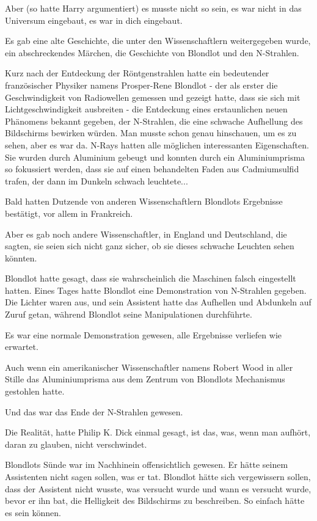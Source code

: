 Aber (so hatte Harry argumentiert) es musste nicht so sein, es war nicht in das
Universum eingebaut, es war in dich eingebaut.

Es gab eine alte Geschichte, die unter den Wissenschaftlern weitergegeben wurde,
ein abschreckendes Märchen, die Geschichte von Blondlot und den N-Strahlen.

Kurz nach der Entdeckung der Röntgenstrahlen hatte ein bedeutender französischer
Physiker namens Prosper-Rene Blondlot - der als erster die Geschwindigkeit von
Radiowellen gemessen und gezeigt hatte, dass sie sich mit Lichtgeschwindigkeit
ausbreiten - die Entdeckung eines erstaunlichen neuen Phänomens bekannt gegeben,
der N-Strahlen, die eine schwache Aufhellung des Bildschirms bewirken würden.
Man musste schon genau hinschauen, um es zu sehen, aber es war da. N-Rays hatten
alle möglichen interessanten Eigenschaften. Sie wurden durch Aluminium gebeugt
und konnten durch ein Aluminiumprisma so fokussiert werden, dass sie auf einen
behandelten Faden aus Cadmiumsulfid trafen, der dann im Dunkeln schwach
leuchtete...

Bald hatten Dutzende von anderen Wissenschaftlern Blondlots Ergebnisse
bestätigt, vor allem in Frankreich.

Aber es gab noch andere Wissenschaftler, in England und Deutschland, die sagten,
sie seien sich nicht ganz sicher, ob sie dieses schwache Leuchten sehen könnten.

Blondlot hatte gesagt, dass sie wahrscheinlich die Maschinen falsch eingestellt
hatten. Eines Tages hatte Blondlot eine Demonstration von N-Strahlen gegeben.
Die Lichter waren aus, und sein Assistent hatte das Aufhellen und Abdunkeln auf
Zuruf getan, während Blondlot seine Manipulationen durchführte.

Es war eine normale Demonstration gewesen, alle Ergebnisse verliefen wie
erwartet.

Auch wenn ein amerikanischer Wissenschaftler namens Robert Wood in aller Stille
das Aluminiumprisma aus dem Zentrum von Blondlots Mechanismus gestohlen hatte.

Und das war das Ende der N-Strahlen gewesen.

Die Realität, hatte Philip K. Dick einmal gesagt, ist das, was, wenn man
aufhört, daran zu glauben, nicht verschwindet.

Blondlots Sünde war im Nachhinein offensichtlich gewesen. Er hätte seinem
Assistenten nicht sagen sollen, was er tat. Blondlot hätte sich vergewissern
sollen, dass der Assistent nicht wusste, was versucht wurde und wann es versucht
wurde, bevor er ihn bat, die Helligkeit des Bildschirms zu beschreiben. So
einfach hätte es sein können.

